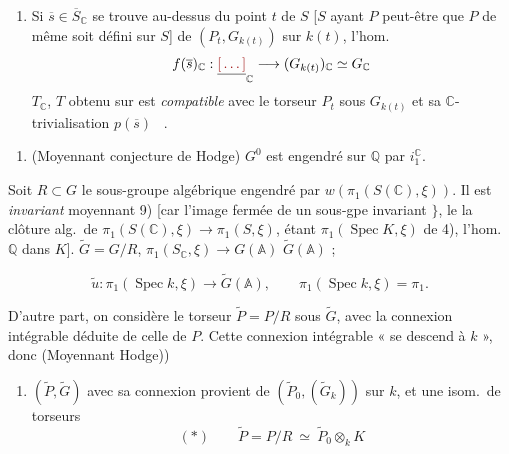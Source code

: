 \documentclass[11pt,a4paper]{article}
\begin{document}
\begin{enumerate}
  \item[13)] Si $\overline{s} \in \overline{S}_{\mathbb{C}}$ se trouve
  au-dessus du point $t$ de $S$ [$S$ ayant \ill{} $P$ \ill{} peut-être que $P$
  \ill{} de même \ill{} soit défini sur $S$] de \ill{} $(P_{t}, G_{k(t)})$ sur
  $k(t)$, \ill{} l'hom.
  \[ f(\overline{s})_{\mathbb{C}} : \struck{\ill{}}_{\mathbb{C}} \longrightarrow (G_{k(t)})_{\mathbb{C}} \simeq G_{\mathbb{C}} \]
  \ill{} $T_{\mathbb{C}}$, $T$ \ill{} obtenu sur \ill{} est \emph{compatible}
  avec le torseur $P_{t}$ sous $G_{k(t)}$ et sa $\mathbb{C}$-trivialisation
  $p(\overline{s})$ \ \add{[$p : \overline{S}_{\mathbb{C}} \to (P_{s})_{\mathbb{C}}$
  et \ill{} le $S(\mathbb{C})^{\circ}$-\ill{}, une connexion \ill{} par la
  condition que $p(\overline{\xi}) = \alpha$]}.
\end{enumerate}


\begin{enumerate}
  \item[10)] (Moyennant conjecture de Hodge) $G^{0}$ est engendré sur
  $\mathbb{Q}$ par $i^{\mathbb{C}}_{1}$.
\end{enumerate}

\struck{\ill{}}


Soit $R \subset G$ le sous-groupe algébrique engendré par
$w(\pi_{1}(S(\mathbb{C}), \xi))$. Il est \emph{invariant} moyennant 9) [car
l'image fermée de \ill{} un sous-gpe invariant $\}$, le \ill{} la clôture alg.\
de $\pi_{1}(S(\mathbb{C}), \xi) \to \pi_{1}(S, \xi)$, \ill{} \ill{} étant
$\pi_{1}(\operatorname{Spec} K, \xi)$ \ill{} de 4), l'hom.\ \ill{} $\mathbb{Q}$
dans $K$]. \struck{\ill{}} \ill{} $\widetilde{G} = G/R$, \ill{}
$\pi_{1}(S_{\mathbb{C}}, \xi) \to G(\mathbb{A})$ \ill{}
$\widetilde{G}(\mathbb{A})$ ; \ill{} \struck{\ill{}}

\[ \widetilde{u} : \pi_{1}(\operatorname{Spec} k, \xi) \longrightarrow \widetilde{G}(\mathbb{A}) , \qquad \pi_{1}(\operatorname{Spec} k, \xi) = \pi_{1} . \]

D'autre part, on considère le torseur $\widetilde{P} = P/R$ sous
$\widetilde{G}$, avec la connexion intégrable déduite de celle de $P$. Cette
connexion intégrable « se descend à $k$ », donc (Moyennant Hodge))

\begin{enumerate}
  \item[16)] $(\widetilde{P}, \widetilde{G})$ avec sa connexion \ill{} provient
  de $(\widetilde{P}_{0}, (\widetilde{G}_{k}))$ sur $k$, et une isom.\ de
  torseurs
  \[ (*) \qquad \widetilde{P} = P/R \ \simeq\ \widetilde{P}_{0} \otimes_{k} K \]
\end{enumerate}
\end{document}
